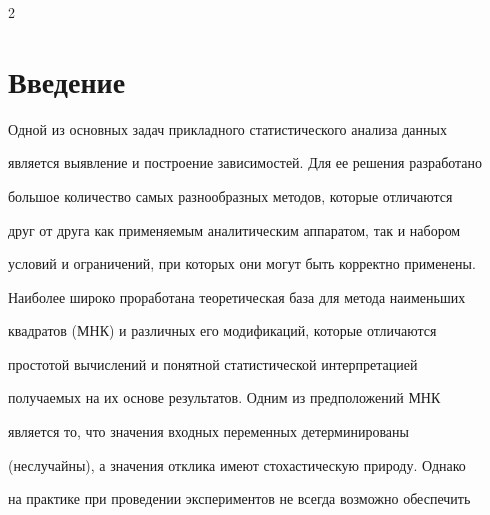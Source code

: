\vspace*{2pt}






\vspace*{3pt}






      \thispagestyle{headings}



      \begin{multicols}{2}



            \label{st\stat}





\section{Введение}



  Одной из основных задач прикладного статистического анализа данных

является выявление и построение зависимостей. Для ее решения разработано

большое количество самых разнообразных методов, которые отличаются

друг от друга как применяемым аналитическим аппаратом, так и набором

условий и ограничений, при которых они могут быть корректно применены.



Наиболее широко проработана теоретическая база для метода наименьших

квадратов (МНК) и различных его модификаций, которые отличаются

простотой вычислений и понятной статистической интерпретацией

получаемых на их основе результатов. Одним из предположений МНК

является то, что значения входных переменных детерминированы

(неслучайны), а значения отклика имеют стохастическую природу. Однако

на практике при проведении экспериментов не всегда возможно обеспечить


\end{multicols}
